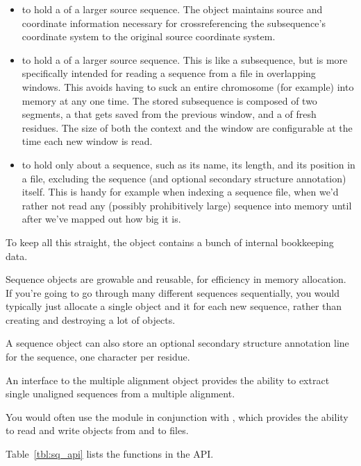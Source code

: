 \begin{itemize}
\item to hold a  of a larger source sequence. The
  object maintains source and coordinate information necessary for
  crossreferencing the subsequence's coordinate system to the original
  source coordinate system.

\item to hold a  of a larger source sequence. This is
  like a subsequence, but is more specifically intended for reading a
  sequence from a file in overlapping windows. This avoids having to
  suck an entire chromosome (for example) into memory at any one
  time. The stored subsequence is composed of two segments, a
   that gets saved from the previous window,
  and a  of fresh residues. The size of both the
  context and the window are configurable at the time each new window
  is read.

\item to hold only  about a sequence, such as its
  name, its length, and its position in a file, excluding the sequence
  (and optional secondary structure annotation) itself. This is handy
  for example when indexing a sequence file, when we'd rather not read
  any (possibly prohibitively large) sequence into memory until after
  we've mapped out how big it is.
\end{itemize}

To keep all this straight, the object contains a bunch of internal
bookkeeping data.

Sequence objects are growable and reusable, for efficiency in memory
allocation. If you're going to go through many different sequences
sequentially, you would typically just allocate a single
 object and  it for each new
sequence, rather than creating and destroying a lot of objects.

A sequence object can also store an optional secondary structure
annotation line for the sequence, one character per residue.

An interface to the  multiple alignment object
provides the ability to extract single unaligned sequences from a
multiple alignment.

You would often use the  module in conjunction with
, which provides the ability to read and write
 objects from and to files.

Table~\ref{tbl:sq_api} lists the functions in the  API.



